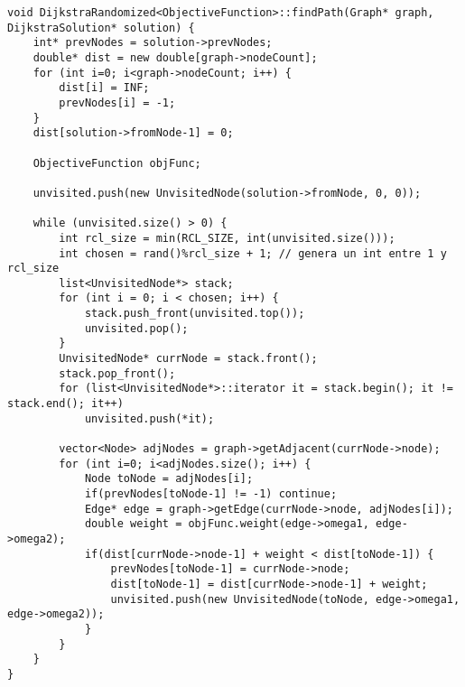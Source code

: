 \begin{lstlisting}[caption=DijkstraRandomized::findPath()]
 void DijkstraRandomized<ObjectiveFunction>::findPath(Graph* graph, DijkstraSolution* solution) {
    int* prevNodes = solution->prevNodes;
    double* dist = new double[graph->nodeCount];
    for (int i=0; i<graph->nodeCount; i++) {
        dist[i] = INF;
        prevNodes[i] = -1;
    }
    dist[solution->fromNode-1] = 0;

    ObjectiveFunction objFunc;

    unvisited.push(new UnvisitedNode(solution->fromNode, 0, 0));
    
    while (unvisited.size() > 0) {
        int rcl_size = min(RCL_SIZE, int(unvisited.size()));
        int chosen = rand()%rcl_size + 1; // genera un int entre 1 y rcl_size         
        list<UnvisitedNode*> stack;
        for (int i = 0; i < chosen; i++) {
            stack.push_front(unvisited.top());
            unvisited.pop();
        }
        UnvisitedNode* currNode = stack.front();        
        stack.pop_front();
        for (list<UnvisitedNode*>::iterator it = stack.begin(); it != stack.end(); it++)
            unvisited.push(*it);
                
        vector<Node> adjNodes = graph->getAdjacent(currNode->node);        
        for (int i=0; i<adjNodes.size(); i++) {            
            Node toNode = adjNodes[i];
            if(prevNodes[toNode-1] != -1) continue;
            Edge* edge = graph->getEdge(currNode->node, adjNodes[i]);
            double weight = objFunc.weight(edge->omega1, edge->omega2);
            if(dist[currNode->node-1] + weight < dist[toNode-1]) {
                prevNodes[toNode-1] = currNode->node;
                dist[toNode-1] = dist[currNode->node-1] + weight;                
                unvisited.push(new UnvisitedNode(toNode, edge->omega1, edge->omega2));
            }
        }
    }    
}
\end{lstlisting}

